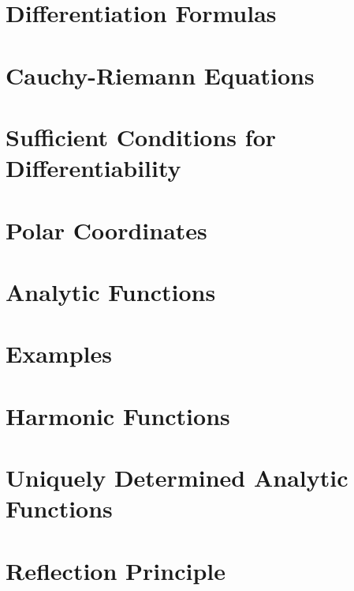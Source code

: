 \documentclass{book}
\theoremstyle{definition}
\begin{document}
\section{Differentiation Formulas}
\section{Cauchy-Riemann Equations}
\section{Sufficient Conditions for Differentiability}
\section{Polar Coordinates}
\section{Analytic Functions}
\section{Examples}
\section{Harmonic Functions}
\section{Uniquely Determined Analytic Functions}
\section{Reflection Principle}


\newpage
\end{document}
